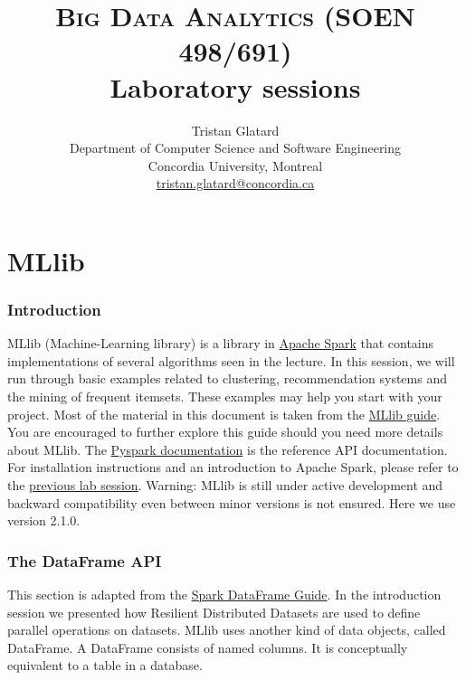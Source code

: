 \documentclass[11pt]{article}
\title{\textsc{Big Data Analytics (SOEN 498/691)} \\ Laboratory sessions}
\author{Tristan Glatard\\Department of Computer Science and Software Engineering\\Concordia University, Montreal\\\href{mailto:tristan.glatard@concordia.ca}{tristan.glatard@concordia.ca}}
\begin{document}
\maketitle

\newpage

\tableofcontents

\newpage

\part{MLlib}

\section{Introduction}

MLlib (Machine-Learning library) is a library in
\href{http://spark.apache.org}{Apache Spark} that contains
implementations of several algorithms seen in the lecture. In this
session, we will run through basic examples related to clustering,
recommendation systems and the mining of frequent itemsets. These
examples may help you start with your project. Most of the material in
this document is taken from the
\href{http://spark.apache.org/docs/latest/ml-guide.html}{MLlib
  guide}. You are encouraged to further explore this guide should you
need more details about MLlib. The
\href{http://spark.apache.org/docs/latest/api/python/index.html}{Pyspark
  documentation} is the reference API documentation.  For installation
instructions and an introduction to Apache Spark, please refer to the
\href{https://github.com/glatard/big-data-analytics-course/releases/download/0.8/spark.pdf}{previous
  lab session}. Warning: MLlib is still under active development and
backward compatibility even between minor versions is not
ensured. Here we use version 2.1.0.


\section{The DataFrame API}

This section is adapted from the
\href{http://spark.apache.org/docs/latest/sql-programming-guide.html}{Spark
  DataFrame Guide}. In the introduction session we presented how
Resilient Distributed Datasets are used to define parallel operations
on datasets. MLlib uses another kind of data objects, called
DataFrame. A DataFrame consists of named columns. It is conceptually
equivalent to a table in a database.
\end{document}

